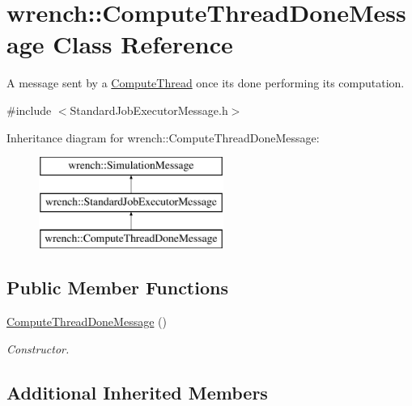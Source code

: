 \hypertarget{classwrench_1_1_compute_thread_done_message}{}\section{wrench\+:\+:Compute\+Thread\+Done\+Message Class Reference}
\label{classwrench_1_1_compute_thread_done_message}


A message sent by a \hyperlink{classwrench_1_1_compute_thread}{Compute\+Thread} once it\textquotesingle{}s done performing its computation.  




{\ttfamily \#include $<$Standard\+Job\+Executor\+Message.\+h$>$}

Inheritance diagram for wrench\+:\+:Compute\+Thread\+Done\+Message\+:\begin{figure}[H]
\begin{center}
\leavevmode
\includegraphics[height=3.000000cm]{classwrench_1_1_compute_thread_done_message}
\end{center}
\end{figure}
\subsection*{Public Member Functions}
\begin{DoxyCompactItemize}
\item 
\mbox{\label{classwrench_1_1_compute_thread_done_message_a4530b9e35cfc117e37ef9e4f25aa15e1}} 
\hyperlink{classwrench_1_1_compute_thread_done_message_a4530b9e35cfc117e37ef9e4f25aa15e1}{Compute\+Thread\+Done\+Message} ()
\begin{DoxyCompactList}\small\item\em Constructor. \end{DoxyCompactList}\end{DoxyCompactItemize}
\subsection*{Additional Inherited Members}


